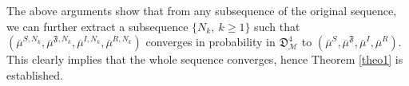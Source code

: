 \documentclass[notitlepage,reqno,11pt]{amsart}
\numberwithin{equation}{section}
\begin{document}
The above arguments show that from any subsequence of the original sequence, we can further extract a subsequence $\{N_k,\ k\ge1\}$ such that  $( \overline{\mu}^{S,N_k}, \overline{\mu}^{\mathfrak{F},N_k},  \overline{\mu}^{I,N_k},  \overline{\mu}^{R,N_k} )$ converges in probability in $\mathfrak{D}_{\mathcal{M}}^4$ to $(  \overline{\mu}^S,  \overline{\mu}^{\mathfrak{F}} ,  \overline{\mu}^I,  \overline{\mu}^R)$. This clearly implies that the whole sequence converges, hence Theorem \ref{theo1}  is established.
\end{document}
